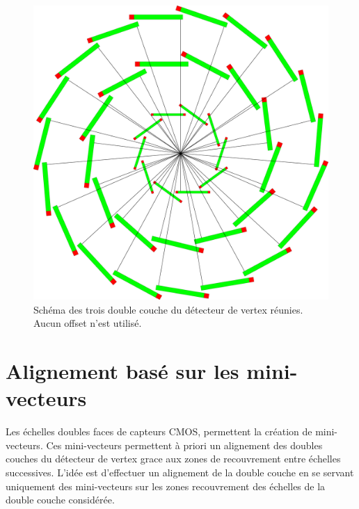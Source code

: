   
  \begin{figure}[!htb]
    \begin{center}
      \includegraphics[scale=0.1]{./figures/CalculsRecouvrment/DL1_DL2_DL3_option1.eps}
      \caption{Sch\'ema des trois double couche du d\'etecteur de vertex r\'eunies. Aucun offset n'est utilis\'e.}
      \label{fig:recouvrement_DL1_DL2_DL3}
    \end{center}
  \end{figure}

\section{Alignement bas\'e sur les mini-vecteurs}
  
  Les \'echelles doubles faces de capteurs CMOS, permettent la cr\'eation de mini-vecteurs. Ces mini-vecteurs permettent \`a priori un alignement des doubles couches du d\'etecteur de vertex grace aux zones de recouvrement entre \'echelles successives. L'id\'ee est d'effectuer un alignement de la double couche en se servant uniquement des mini-vecteurs sur les zones recouvrement des échelles de la double couche consid\'er\'ee.
  
  \medskip
  
